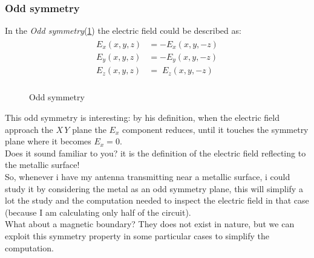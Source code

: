 \subsubsection*{Odd symmetry}
In the \emph{Odd symmetry}(\cref{fig:odd_simmetry}) the electric field could be described as:
\begin{align}
    \begin{split}
        E_x(x,y,z)&=-E_x(x,y,-z)\\[5pt]
        E_y(x,y,z)&=-E_y(x,y,-z)\\[5pt]
        E_z(x,y,z)&=\;E_z(x,y,-z)\\[5pt]
    \end{split}
\end{align}
\begin{figure}[H]
    \begin{center}
    \end{center}\caption{Odd symmetry}\label{fig:odd_simmetry} 
\end{figure}
This odd symmetry is interesting: by his definition, when the electric field approach the $X\,Y$ plane the $E_x$ component reduces, until it touches the symmetry plane where it becomes $E_x=0$.\\
Does it sound familiar to you? it is the definition of the electric field reflecting to the metallic surface!\\
So, whenever i have my antenna transmitting near a metallic surface, i could study it by considering the metal as an odd symmetry plane, this will simplify a lot the study and the computation needed to inspect the electric field in that case (because I am calculating only half of the circuit).\\
What about a magnetic boundary? They does not exist in nature, but we can exploit this symmetry property in some particular cases to simplify the computation.
